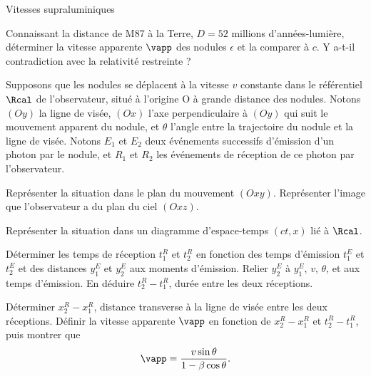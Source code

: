 \begin{exo}[PC][3][TD]{Vitesses supraluminiques}
    \begin{quest}
      \item	Connaissant la distance de M87 à la Terre, $D=52$ millions d'années-lumière, déterminer la vitesse apparente $\vapp$ des nodules $\epsilon$ et la comparer à $c$. Y a-t-il contradiction avec la relativité restreinte ?
    \end{quest}
    Supposons que les nodules se déplacent à la vitesse $v$ constante dans le référentiel $\Rcal$ de l'observateur, situé à l'origine O à grande distance des nodules. Notons $(Oy)$ la ligne de visée, $(Ox)$ l'axe perpendiculaire à $(Oy)$ qui suit le mouvement apparent du nodule, et $\theta$ l'angle entre la trajectoire du nodule et la ligne de visée. Notons $E_1$ et $E_2$ deux événements successifs d'émission d'un photon par le nodule, et $R_1$ et $R_2$ les événements de réception de ce photon par l'observateur. 
    \begin{quest}
      \item Représenter la situation dans le plan du mouvement $(Oxy)$. Représenter l'image que l'observateur a du plan du ciel $(Oxz)$.
      \item Représenter la situation dans un diagramme d'espace-temps $(ct,x)$ lié à $\Rcal$.
      \item Déterminer les temps de réception $t_1^R$ et $t_2^R$ en fonction des temps d'émission $t_1^E$ et $t_2^E$ et des distances $y_1^E$ et $y_2^E$ aux moments d'émission. Relier $y_2^E$ à $y_1^E$, $v$, $\theta$, et aux temps d'émission. En déduire $t_2^R-t_1^R$, durée entre les deux réceptions.
      \item Déterminer $x_2^R-x_1^R$, distance transverse à la ligne de visée entre les deux réceptions. Définir la vitesse apparente $\vapp$ en fonction de $x_2^R-x_1^R$ et $t_2^R-t_1^R$, puis montrer que 
      \begin{equation}
        \vapp = \frac{v\sin\theta}{1 - \beta \cos \theta}.
      \end{equation}
  

\end{quest}
\end{exo}
